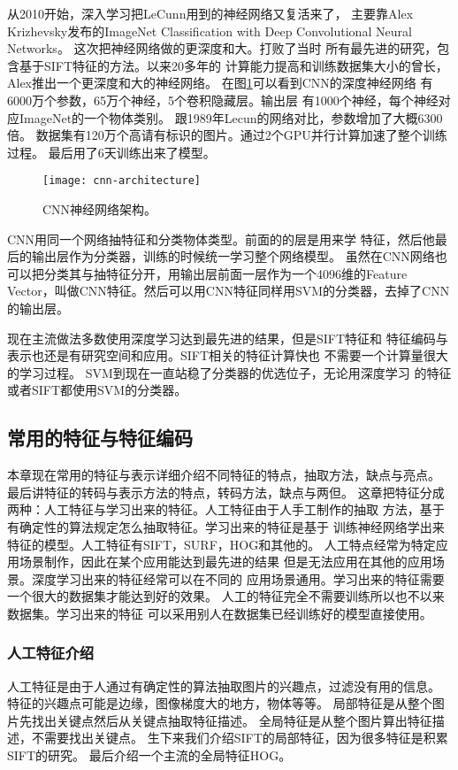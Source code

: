 从2010开始，深入学习把LeCunn用到的神经网络又复活来了，
主要靠Alex Krizhevsky发布的ImageNet Classification with Deep Convolutional Neural Networks。
这次把神经网络做的更深度和大。打败了当时
所有最先进的研究，包含基于SIFT特征的方法。以来20多年的
计算能力提高和训练数据集大小的曾长，Alex推出一个更深度和大的神经网络。
在图\ref{fig:cnn-architecture}可以看到CNN的深度神经网络
有6000万个参数，65万个神经，5个卷积隐藏层。输出层
有1000个神经，每个神经对应ImageNet的一个物体类别。
跟1989年Lecun的网络对比，参数增加了大概6300倍。
数据集有120万个高请有标识的图片。通过2个GPU并行计算加速了整个训练过程。
最后用了6天训练出来了模型。\cite{krizhevsky2012imagenet,lee2009convolutional}
\begin{figure}[H]
  \centering
    \texttt{[image: cnn-architecture]}
  \caption{CNN神经网络架构。\cite{krizhevsky2012imagenet}}
  \label{fig:cnn-architecture}
\end{figure}

CNN用同一个网络抽特征和分类物体类型。前面的的层是用来学
特征，然后他最后的输出层作为分类器，训练的时候统一学习整个网络模型。
虽然在CNN网络也可以把分类其与抽特征分开，用输出层前面一层作为一个4096维的Feature 
Vector，叫做CNN特征。然后可以用CNN特征同样用SVM的分类器，去掉了CNN的输出层。
\cite{razavian2014cnn}

现在主流做法多数使用深度学习达到最先进的结果，但是SIFT特征和
特征编码与表示也还是有研究空间和应用。SIFT相关的特征计算快也
不需要一个计算量很大的学习过程。
SVM到现在一直站稳了分类器的优选位子，无论用深度学习
的特征或者SIFT都使用SVM的分类器。

\subsection{常用的特征与特征编码}
\label{intro:image_features}
本章现在常用的特征与表示详细介绍不同特征的特点，抽取方法，缺点与亮点。
最后讲特征的转码与表示方法的特点，转码方法，缺点与两但。
这章把特征分成两种：人工特征与学习出来的特征。人工特征由于人手工制作的抽取
方法，基于有确定性的算法规定怎么抽取特征。学习出来的特征是基于
训练神经网络学出来特征的模型。人工特征有SIFT，SURF，HOG和其他的。
人工特点经常为特定应用场景制作，因此在某个应用能达到最先进的结果
但是无法应用在其他的应用场景。深度学习出来的特征经常可以在不同的
应用场景通用。学习出来的特征需要一个很大的数据集才能达到好的效果。
人工的特征完全不需要训练所以也不以来数据集。学习出来的特征
可以采用别人在数据集已经训练好的模型直接使用。

\subsubsection{人工特征介绍}
人工特征是由于人通过有确定性的算法抽取图片的兴趣点，过滤没有用的信息。
特征的兴趣点可能是边缘，图像梯度大的地方，物体等等。
局部特征是从整个图片先找出关键点然后从关键点抽取特征描述。
全局特征是从整个图片算出特征描述，不需要找出关键点。
生下来我们介绍SIFT的局部特征，因为很多特征是积累SIFT的研究。
最后介绍一个主流的全局特征HOG。

